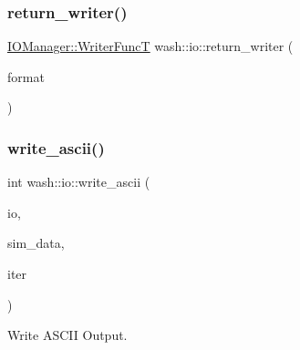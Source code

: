 \mbox{\label{namespacewash_1_1io_ac3ef6862cb415612f2bd0f102459511e}} 
\subsubsection{\texorpdfstring{return\+\_\+writer()}{return\_writer()}}
{\footnotesize\ttfamily \mbox{\hyperlink{classwash_1_1io_1_1IOManager_aeda8c39a8e3c748efd1b3e0f8ae823ee}{I\+O\+Manager\+::\+Writer\+FuncT}} wash\+::io\+::return\+\_\+writer (\begin{DoxyParamCaption}\item[{const std\+::string}]{format }\end{DoxyParamCaption})}

\mbox{\label{namespacewash_1_1io_ab29d891bfd64999f5ffb3aa5b13c5b22}} 
\subsubsection{\texorpdfstring{write\+\_\+ascii()}{write\_ascii()}}
{\footnotesize\ttfamily int wash\+::io\+::write\+\_\+ascii (\begin{DoxyParamCaption}\item[{const \mbox{\hyperlink{classwash_1_1io_1_1IOManager}{I\+O\+Manager}} \&}]{io,  }\item[{const \mbox{\hyperlink{structwash_1_1io_1_1SimulationData}{Simulation\+Data}} \&}]{sim\+\_\+data,  }\item[{const size\+\_\+t}]{iter }\end{DoxyParamCaption})}



Write A\+S\+C\+II Output. 

